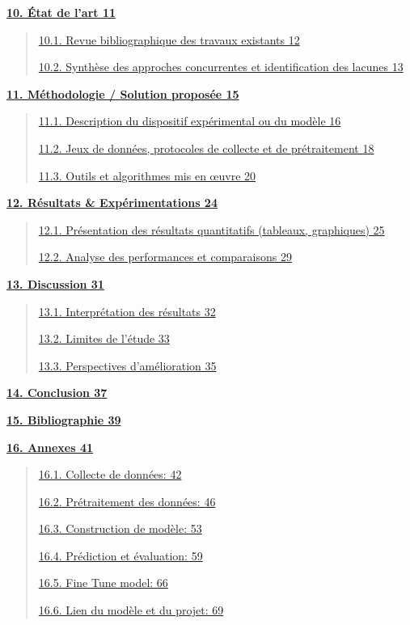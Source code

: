 \documentclass[
]{article}
\begin{document}
\href{/l}{\textbf{10. État de l'art 11}}

\begin{quote}
\href{/l}{10.1. Revue bibliographique des travaux existants 12}

\href{/l}{10.2. Synthèse des approches concurrentes et identification des lacunes 13}
\end{quote}

\href{/l}{\textbf{11. Méthodologie / Solution proposée 15}}

\begin{quote}
\href{/l}{11.1. Description du dispositif expérimental ou du modèle 16}

\href{/l}{11.2. Jeux de données, protocoles de collecte et de prétraitement 18}

\href{/l}{11.3. Outils et algorithmes mis en œuvre 20}
\end{quote}

\href{/l}{\textbf{12. Résultats \& Expérimentations 24}}

\begin{quote}
\href{/l}{12.1. Présentation des résultats quantitatifs (tableaux, graphiques) 25}

\href{/l}{12.2. Analyse des performances et comparaisons 29}
\end{quote}

\href{/l}{\textbf{13. Discussion 31}}

\begin{quote}
\href{/l}{13.1. Interprétation des résultats 32}

\href{/l}{13.2. Limites de l'étude 33}

\href{/l}{13.3. Perspectives d'amélioration 35}
\end{quote}

\href{/l}{\textbf{14. Conclusion 37}}

\href{/l}{\textbf{15. Bibliographie 39}}

\href{/l}{\textbf{16. Annexes 41}}

\begin{quote}
\href{/l}{16.1. Collecte de données: 42}

\href{/l}{16.2. Prétraitement des données: 46}

\href{/l}{16.3. Construction de modèle: 53}

\href{/l}{16.4. Prédiction et évaluation: 59}

\href{/l}{16.5. Fine Tune model: 66}

\href{/l}{16.6. Lien du modèle et du projet: 69}
\end{quote}
\end{document}
